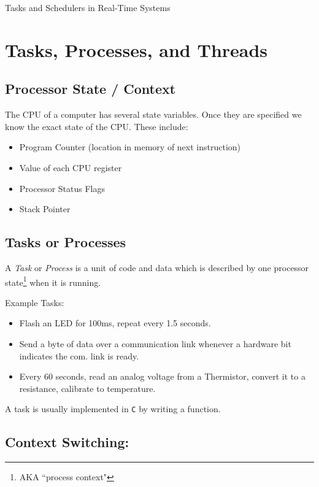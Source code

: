 \documentclass{article}	%
\begin{document}


\begin{center}
{\Large Tasks and Schedulers in Real-Time Systems}
\end{center}

\section{Tasks, Processes, and Threads}
\subsection{Processor State / Context}

The CPU of a computer has several state variables.  Once they are
specified we know the exact state of the CPU.  These include:
\begin{itemize}
        \item Program Counter (location in memory of next instruction)
        \item Value of each CPU register
        \item Processor Status Flags
        \item Stack Pointer
\end{itemize}



\subsection{Tasks or Processes}

A {\it Task} or {\it Process} is a unit of code and data which is
described by one processor state\footnote{AKA ``process context"}  when it is running. 

Example Tasks:
\begin{itemize}
    \item Flash an LED for 100ms, repeat every 1.5 seconds.
    \item Send a byte of data over a communication link whenever a hardware bit indicates
    the com. link is ready. 
    \item Every 60 seconds, read an analog voltage from a Thermistor, convert it to a resistance, calibrate to temperature. 
\end{itemize}

A task is usually implemented in {\tt C} by writing a function.

\subsection{Context Switching:}
\end{document}
